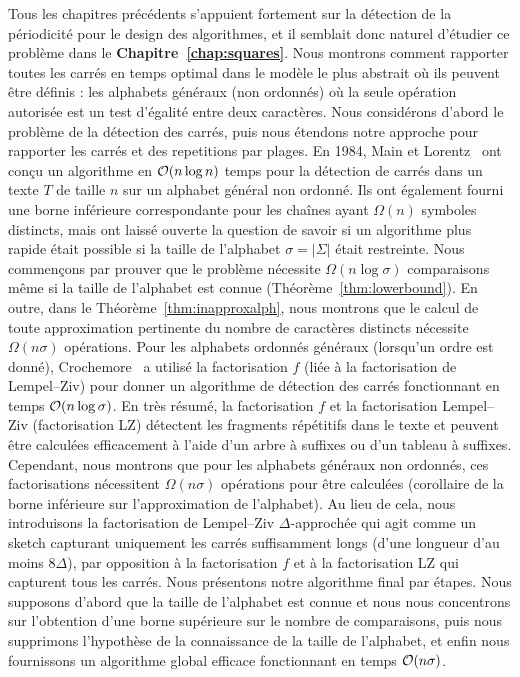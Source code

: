 Tous les chapitres précédents s'appuient fortement sur la détection de la périodicité pour le design des algorithmes, et il semblait donc naturel d'étudier ce problème dans le \textbf{Chapitre~\ref{chap:squares}}. Nous montrons comment rapporter toutes les carrés en temps optimal dans le modèle le plus abstrait où ils peuvent être définis : les alphabets généraux (non ordonnés) où la seule opération autorisée est un test d'égalité entre deux caractères. 
Nous considérons d'abord le problème de la détection des carrés, puis nous étendons notre approche pour rapporter les carrés et des repetitions par plages.
% 
En 1984, Main et Lorentz~\cite{Main1984} ont conçu un algorithme en $\mathcal{O}(n\log n)$ temps pour la détection de carrés dans un texte $T$ de taille $n$ sur un alphabet général non ordonné. Ils ont également fourni une borne inférieure correspondante pour les chaînes ayant $\Omega(n)$ symboles distincts, mais ont laissé ouverte la question de savoir si un algorithme plus rapide était possible si la taille de l'alphabet $\sigma=|\Sigma|$ était restreinte.
% 
Nous commençons par prouver que le problème nécessite $\Omega(n \log \sigma)$ comparaisons même si la taille de l'alphabet est connue (Théorème~\ref{thm:lowerbound}). En outre, dans le Théorème~\ref{thm:inapproxalph}, nous montrons que le calcul de toute approximation pertinente du nombre de caractères distincts nécessite $\Omega(n\sigma)$ opérations.
%
Pour les alphabets ordonnés généraux (lorsqu'un ordre est donné), Crochemore~\cite{Crochemore1986} a utilisé la factorisation $f$ (liée à la  factorisation de Lempel--Ziv) pour donner un algorithme de détection des carrés fonctionnant en temps $\mathcal{O}(n\log \sigma)$. En très résumé, la factorisation $f$ et la factorisation Lempel--Ziv (factorisation LZ) détectent les fragments répétitifs dans le texte et peuvent être calculées efficacement à l'aide d'un arbre à suffixes ou d'un tableau à suffixes. Cependant, nous montrons que pour les alphabets généraux non ordonnés, ces factorisations nécessitent $\Omega(n\sigma)$ opérations pour être calculées (corollaire de la borne inférieure sur l'approximation de l'alphabet). 
% 
Au lieu de cela, nous introduisons la factorisation de Lempel--Ziv $\Delta$-approchée qui agit comme un sketch capturant uniquement les carrés suffisamment longs (d'une longueur d'au moins $8\Delta$), par opposition à la factorisation $f$ et à la factorisation LZ qui capturent tous les carrés.
Nous présentons notre algorithme final par étapes. Nous supposons d'abord que la taille de l'alphabet est connue et nous nous concentrons sur l'obtention d'une borne supérieure sur le nombre de comparaisons, puis nous supprimons l'hypothèse de la connaissance de la taille de l'alphabet, et enfin nous fournissons un algorithme global efficace fonctionnant en temps $\mathcal{O}(n\sigma)$.\\


